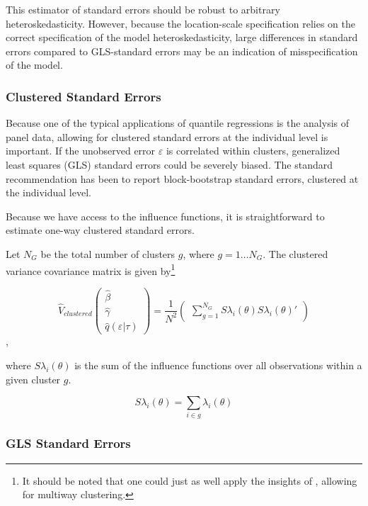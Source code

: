 \documentclass[
  authoryear,
  review,
  1p]{elsarticle}
\begin{document}
This estimator of standard errors should be robust to arbitrary
heteroskedasticity. However, because the location-scale specification
relies on the correct specification of the model heteroskedasticity,
large differences in standard errors compared to GLS-standard errors may
be an indication of misspecification of the model.

\hypertarget{clustered-standard-errors}{%
\subsubsection{Clustered Standard
Errors}\label{clustered-standard-errors}}

Because one of the typical applications of quantile regressions is the
analysis of panel data, allowing for clustered standard errors at the
individual level is important. If the unobserved error \(\varepsilon\)
is correlated within clusters, generalized least squares (GLS) standard errors could be severely
biased. The standard recommendation has been to report block-bootstrap
standard errors, clustered at the individual level.

Because we have access to the influence functions, it is straightforward
to estimate one-way clustered standard errors.

Let \(N_G\) be the total number of clusters $g$, where
\(g=1\dots N_G\). The clustered variance covariance matrix is given
by\footnote{It should be noted that one could just as well apply the
  insights of \citet{cameron_robust_2011}, allowing for multiway
  clustering.}

\[\hat{V}_{clustered}
  \begin{pmatrix}
  \hat\beta \\
  \hat\gamma \\
  \hat q(\varepsilon|\tau)
  \end{pmatrix}
 = \frac{1}{N^2} 
 \begin{pmatrix}
 \sum_{g=1}^{N_G} S\lambda_i(\theta) S\lambda_i(\theta)'
  \end{pmatrix}
\],

where \(S\lambda_i(\theta)\) is the sum of the influence functions over
all observations within a given cluster \(g\).

\[S\lambda_i(\theta) = \sum_{i\in g} \lambda_i(\theta)
\]

\hypertarget{gls-standard-errors}{%
\subsubsection{GLS Standard Errors}\label{gls-standard-errors}}
\end{document}
